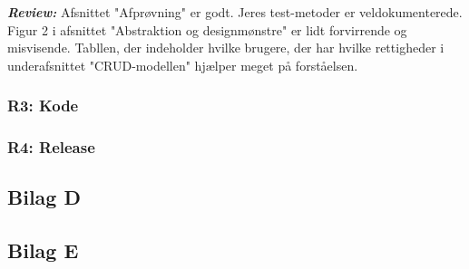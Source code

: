 \documentclass[12pt]{article}
\begin{document}
\textit{\textbf{Review:}}
Afsnittet "Afprøvning" er godt. Jeres test-metoder er veldokumenterede.
Figur 2 i afsnittet "Abstraktion og designmønstre" er lidt forvirrende og misvisende.
Tabllen, der indeholder hvilke brugere, der har hvilke rettigheder i underafsnittet "CRUD-modellen" hjælper meget på forståelsen.

\subsubsection{R3: Kode}
\subsubsection{R4: Release}
\subsection{Bilag D}

\newpage
\subsection{Bilag E}
\end{document}
